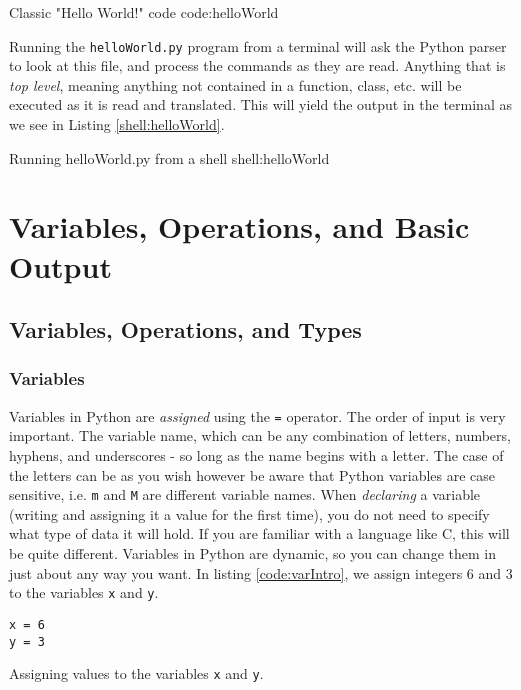 \documentclass[oneside]{book}
\begin{document}
       {Classic "Hello World!" code}
       {code:helloWorld}

Running the \texttt{helloWorld.py} program from a terminal will ask the Python parser to look at this file, and process the commands as they are read. Anything that is \textit{top level}, meaning anything not contained in a function, class, etc. will be executed as it is read and translated. This will yield the output in the terminal as we see in Listing \ref{shell:helloWorld}.

      {Running helloWorld.py from a shell}
      {shell:helloWorld}

\FloatBarrier

\chapter{Variables, Operations, and Basic Output}

\section{Variables, Operations, and Types}\label{sec:vars-types-ops}

\subsection{Variables}

Variables in Python are \textit{assigned} using the \texttt{=} operator. The order of input is very important. The variable name, which can be any combination of letters, numbers, hyphens, and underscores - so long as the name begins with a letter. The case of the letters can be as you wish however be aware that Python variables are case sensitive, i.e. \texttt{m} and \texttt{M} are different variable names. When \textit{declaring} a variable (writing and assigning it a value for the first time), you do not need to specify what type of data it will hold. If you are familiar with a language like C, this will be quite different. Variables in Python are dynamic, so you can change them in just about any way you want. In listing \ref{code:varIntro}, we assign integers 6 and 3 to the variables \texttt{x} and \texttt{y}.

%

\begin{listing}[htb]
\begin{mdframed}[backgroundcolor=codebg]
\begin{verbatim}
x = 6
y = 3
\end{verbatim}
\end{mdframed}
\caption{Assigning values to the variables \texttt{x} and \texttt{y}.}
\label{code:varIntro}
\end{listing}
\end{document}
